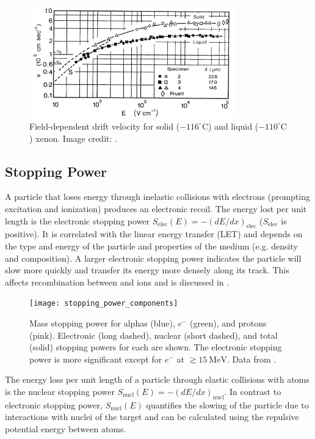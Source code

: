 \begin{figure}
\includegraphics[angle=0.5, width=0.8\textwidth]{DriftVelocity}
\caption{Field-dependent drift velocity for solid ($-116^{\circ}\mathrm{C}$) and liquid ($-110^{\circ}\mathrm{C}$) xenon.  Image credit:
.}
\label{fig:drift_velocity}
\end{figure}




\subsection{Stopping Power}
\label{subsec:stopping_power}
A particle that loses energy through inelastic collisions with electrons (prompting excitation and ionization) produces an electronic
recoil.  The energy lost per unit
length is the electronic stopping power $S_{\mathrm{elec}}(E) = -(dE/dx)_{\mathrm{elec}}$ ($S_{\mathrm{elec}}$ is positive).  It is
correlated with the linear energy transfer (LET) and depends on the type and energy of the particle and properties of the
medium (e.g. density and composition).  A larger electronic stopping power indicates the particle will slow more quickly and
transfer its energy more densely along its track.  This affects recombination between \electron and ions and is discussed in
.

\begin{figure}[t]
\texttt{[image: stopping\_power\_components]}
\caption{Mass stopping power for alphas (blue), $e^{-}$ (green), and protons (pink).  Electronic (long dashed), nuclear (short dashed),
and total (solid) stopping powers for each are shown.  The electronic stopping power is more significant except for $e^-$ at
$\gtrsim 15\ \mathrm{MeV}$.  Data from .}
\label{fig:mass_stopping_power}
\end{figure}

The energy loss per unit length of a particle through elastic collisions with atoms is the nuclear stopping power
$S_{\mathrm{nucl}}(E) = -(dE/dx)_{\mathrm{nucl}}$.  In contrast to electronic stopping power,
$S_{\mathrm{nucl}}(E)$ quantifies the slowing of the particle due to interactions with nuclei of the target and can be calculated using
the repulsive potential energy between atoms.

